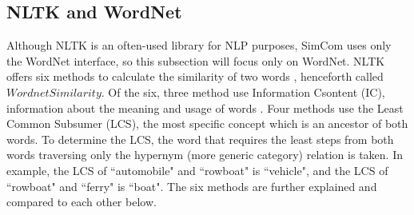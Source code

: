 \documentclass{article}
\begin{document}
\subsection{NLTK and WordNet}
Although NLTK is an often-used library for NLP purposes, SimCom uses only the WordNet interface, so this subsection will focus only on WordNet. 
NLTK offers six methods to calculate the similarity of two words \citep{pedersen2004wordnet}, henceforth called $\textit{WordnetSimilarity}$. Of the six, three method use Information Csontent (IC), information about the meaning and usage of words \cite{seco2004intrinsic}. Four methods use the Least Common Subsumer (LCS), the most specific concept which is an ancestor of both words. To determine the LCS, the word that requires the least steps from both words traversing only the hypernym (more generic category) relation is taken. In example, the LCS of ``automobile" and ``rowboat" is ``vehicle", and the LCS of ``rowboat" and ``ferry" is ``boat". The six methods are further explained and compared to each other below.
\end{document}
